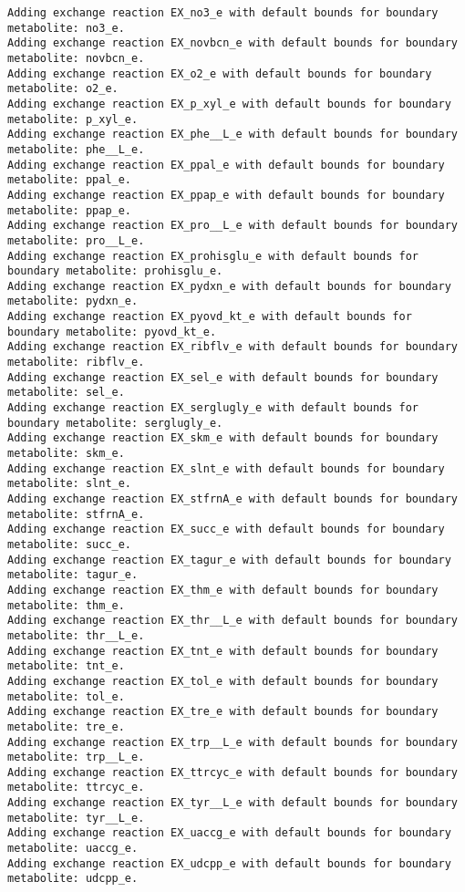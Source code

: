 \documentclass[
  letterpaper,
  DIV=11,
  numbers=noendperiod]{scrartcl}
\begin{document}
\begin{verbatim}
Adding exchange reaction EX_no3_e with default bounds for boundary metabolite: no3_e.
Adding exchange reaction EX_novbcn_e with default bounds for boundary metabolite: novbcn_e.
Adding exchange reaction EX_o2_e with default bounds for boundary metabolite: o2_e.
Adding exchange reaction EX_p_xyl_e with default bounds for boundary metabolite: p_xyl_e.
Adding exchange reaction EX_phe__L_e with default bounds for boundary metabolite: phe__L_e.
Adding exchange reaction EX_ppal_e with default bounds for boundary metabolite: ppal_e.
Adding exchange reaction EX_ppap_e with default bounds for boundary metabolite: ppap_e.
Adding exchange reaction EX_pro__L_e with default bounds for boundary metabolite: pro__L_e.
Adding exchange reaction EX_prohisglu_e with default bounds for boundary metabolite: prohisglu_e.
Adding exchange reaction EX_pydxn_e with default bounds for boundary metabolite: pydxn_e.
Adding exchange reaction EX_pyovd_kt_e with default bounds for boundary metabolite: pyovd_kt_e.
Adding exchange reaction EX_ribflv_e with default bounds for boundary metabolite: ribflv_e.
Adding exchange reaction EX_sel_e with default bounds for boundary metabolite: sel_e.
Adding exchange reaction EX_serglugly_e with default bounds for boundary metabolite: serglugly_e.
Adding exchange reaction EX_skm_e with default bounds for boundary metabolite: skm_e.
Adding exchange reaction EX_slnt_e with default bounds for boundary metabolite: slnt_e.
Adding exchange reaction EX_stfrnA_e with default bounds for boundary metabolite: stfrnA_e.
Adding exchange reaction EX_succ_e with default bounds for boundary metabolite: succ_e.
Adding exchange reaction EX_tagur_e with default bounds for boundary metabolite: tagur_e.
Adding exchange reaction EX_thm_e with default bounds for boundary metabolite: thm_e.
Adding exchange reaction EX_thr__L_e with default bounds for boundary metabolite: thr__L_e.
Adding exchange reaction EX_tnt_e with default bounds for boundary metabolite: tnt_e.
Adding exchange reaction EX_tol_e with default bounds for boundary metabolite: tol_e.
Adding exchange reaction EX_tre_e with default bounds for boundary metabolite: tre_e.
Adding exchange reaction EX_trp__L_e with default bounds for boundary metabolite: trp__L_e.
Adding exchange reaction EX_ttrcyc_e with default bounds for boundary metabolite: ttrcyc_e.
Adding exchange reaction EX_tyr__L_e with default bounds for boundary metabolite: tyr__L_e.
Adding exchange reaction EX_uaccg_e with default bounds for boundary metabolite: uaccg_e.
Adding exchange reaction EX_udcpp_e with default bounds for boundary metabolite: udcpp_e.

\end{verbatim}
\end{document}

